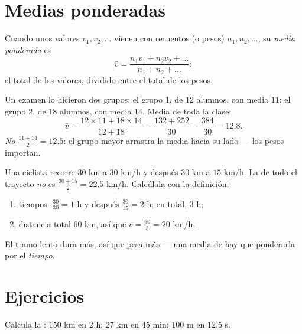 \section{Medias ponderadas}

\begin{definition}\label{def:g8:speed:average}
Cuando unos valores $v_1, v_2, \dots$ vienen con recuentos (o pesos)
$n_1, n_2, \dots$, su \emph{media ponderada}
es
\[
\bar v = \frac{n_1 v_1 + n_2 v_2 + \dots}{n_1 + n_2 + \dots} :
\]
el total de los valores, dividido entre el total de los pesos.
\end{definition}

\begin{example}\label{ex:g8:speed:average}
Un examen lo hicieron dos grupos: el grupo 1, de $12$ alumnos, con media
$11$; el grupo 2, de $18$ alumnos, con media $14$. Media de toda la
clase:
\[
\bar v = \frac{12 \times 11 + 18 \times 14}{12 + 18}
= \frac{132 + 252}{30} = \frac{384}{30} = 12.8 .
\]
\emph{No} $\frac{11 + 14}{2} = 12.5$: el grupo mayor arrastra la
media hacia su lado --- los pesos importan.
\end{example}

\begin{example}\label{ex:g8:speed:twolegs}
Una ciclista recorre $30$ km a $30$ km/h y después $30$ km a $15$ km/h. La
 de todo el trayecto \emph{no} es
$\frac{30 + 15}{2} = 22.5$ km/h. Calcúlala con la definición:
\begin{enumerate}
  \item tiempos: $\frac{30}{30} = 1$ h y después $\frac{30}{15} = 2$ h;
        en total, $3$ h;
  \item distancia total $60$ km, así que
        $v = \frac{60}{3} = 20$ km/h.
\end{enumerate}
El tramo lento dura más, así que pesa más --- una media de 
hay que ponderarla por el \emph{tiempo}.
\end{example}

\section{Ejercicios}

\begin{exercise}[$\star$]\label{exo:g8:speed:1}
Calcula la : $150$ km en $2$ h; $27$ km en $45$ min;
$100$ m en $12.5$ s.
\end{exercise}

